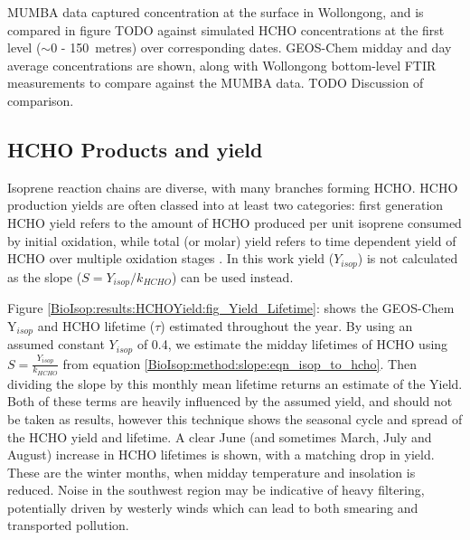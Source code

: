    
    MUMBA data captured concentration at the surface in Wollongong, and is compared in figure TODO against simulated HCHO concentrations at the first level ($\sim$0 - 150~metres) over corresponding dates.
    GEOS-Chem midday and day average concentrations are shown, along with Wollongong bottom-level FTIR measurements to compare against the MUMBA data.
    TODO Discussion of comparison.
  
    
  \subsection{HCHO Products and yield}
    \label{BioIsop:results:HCHOYield}
    
    Isoprene reaction chains are diverse, with many branches forming HCHO.
    HCHO production yields are often classed into at least two categories: first generation HCHO yield refers to the amount of HCHO produced per unit isoprene consumed by initial oxidation, while total (or molar) yield refers to time dependent yield of HCHO over multiple oxidation stages \parencite{Wolfe2016}.
    In this work yield ($Y_{isop}$) is not calculated as the slope ($S = Y_{isop}/k_{HCHO}$) can be used instead.
    
    Figure \ref{BioIsop:results:HCHOYield:fig_Yield_Lifetime}: shows the GEOS-Chem Y$_{isop}$ and HCHO lifetime ($\tau$) estimated throughout the year.
    By using an assumed constant $Y_{isop}$ of 0.4, we estimate the midday lifetimes of HCHO using $S = \frac{Y_{isop}}{k_{HCHO}}$ from equation \ref{BioIsop:method:slope:eqn_isop_to_hcho}.
    Then dividing the slope by this monthly mean lifetime returns an estimate of the Yield.
    Both of these terms are heavily influenced by the assumed yield, and should not be taken as results, however this technique shows the seasonal cycle and spread of the HCHO yield and lifetime.
    A clear June (and sometimes March, July and August) increase in HCHO lifetimes is shown, with a matching drop in yield. 
    These are the winter months, when midday temperature and insolation is reduced.
    Noise in the southwest region may be indicative of heavy filtering, potentially driven by westerly winds which can lead to both smearing and transported pollution.
    
